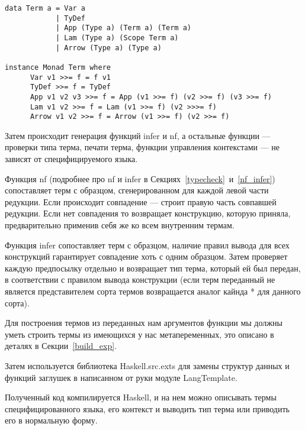\begin{lstlisting}[caption={Сгенерированное представление АСТ STLC на Haskell и представитель класса Monad},captionpos=b, frame=single, float, floatplacement=H, label={lst_gen_stlc}]
data Term a = Var a
            | TyDef
            | App (Type a) (Term a) (Term a)
            | Lam (Type a) (Scope Term a)
            | Arrow (Type a) (Type a)

instance Monad Term where
      Var v1 >>= f = f v1
      TyDef >>= f = TyDef
      App v1 v2 v3 >>= f = App (v1 >>= f) (v2 >>= f) (v3 >>= f)
      Lam v1 v2 >>= f = Lam (v1 >>= f) (v2 >>>= f)
      Arrow v1 v2 >>= f = Arrow (v1 >>= f) (v2 >>= f)
\end{lstlisting}

Затем происходит генерация функций infer и nf, а остальные функции --- проверки типа терма, печати терма, функции управления контекстами --- не зависят от специфицируемого языка.

\hfill

Функция nf (подробнее про nf и infer в Секциях~\ref{typecheck}~и~\ref{nf_infer}) сопоставляет терм с образцом, сгенерированном для каждой левой части редукции. Если происходит совпадение --- строит правую часть совпавшей редукции. Если нет совпадения то возвращает конструкцию, которую приняла, предварительно применив себя же ко всем внутренним термам.

Функция infer сопоставляет терм с образцом, наличие правил вывода для всех конструкций гарантирует совпадение хоть с одним образцом. Затем проверяет каждую предпосылку отдельно и возвращает тип терма, который ей был передан, в соответствии с правилом вывода конструкции (если терм переданный не является представителем сорта термов возвращается аналог кайнда * для данного сорта).

Для построения термов из переданных нам аргументов функции мы должны уметь строить термы из имеющихся у нас метапеременных, это описано в деталях в Секции~\ref{build_exp}.

Затем используется библиотека Haskell.src.exts\cite{src_exts} для замены структур данных и функций заглушек в написанном от руки модуле LangTemplate.

Полученный код компилируется Haskell, и на нем можно описывать термы специфицированного языка, его контекст и выводить тип терма или приводить его в нормальную форму.










